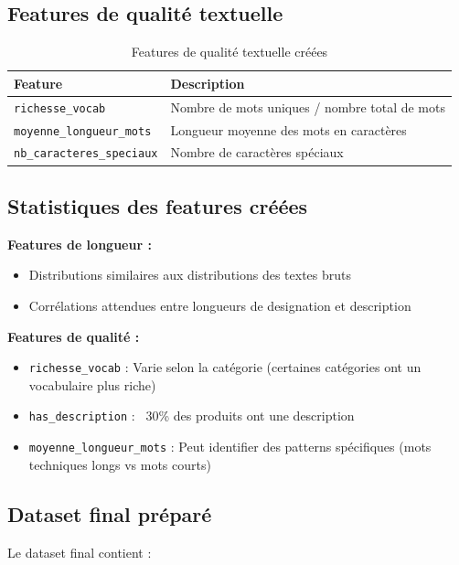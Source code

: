 \documentclass[12pt,a4paper]{article}
\begin{document}
\subsection{Features de qualité textuelle}

\begin{table}[H]
\centering
\begin{tabular}{@{}lp{10cm}@{}}
\toprule
\textbf{Feature} & \textbf{Description} \\
\midrule
\texttt{richesse\_vocab} & Nombre de mots uniques / nombre total de mots \\
\texttt{moyenne\_longueur\_mots} & Longueur moyenne des mots en caractères \\
\texttt{nb\_caracteres\_speciaux} & Nombre de caractères spéciaux \\
\bottomrule
\end{tabular}
\caption{Features de qualité textuelle créées}
\label{tab:features_qualite}
\end{table}

\subsection{Statistiques des features créées}

\textbf{Features de longueur :}
\begin{itemize}
    \item Distributions similaires aux distributions des textes bruts
    \item Corrélations attendues entre longueurs de designation et description
\end{itemize}

\textbf{Features de qualité :}
\begin{itemize}
    \item \texttt{richesse\_vocab} : Varie selon la catégorie (certaines catégories ont un vocabulaire plus riche)
    \item \texttt{has\_description} : ~30\% des produits ont une description
    \item \texttt{moyenne\_longueur\_mots} : Peut identifier des patterns spécifiques (mots techniques longs vs mots courts)
\end{itemize}

\subsection{Dataset final préparé}

Le dataset final contient :
\end{document}
